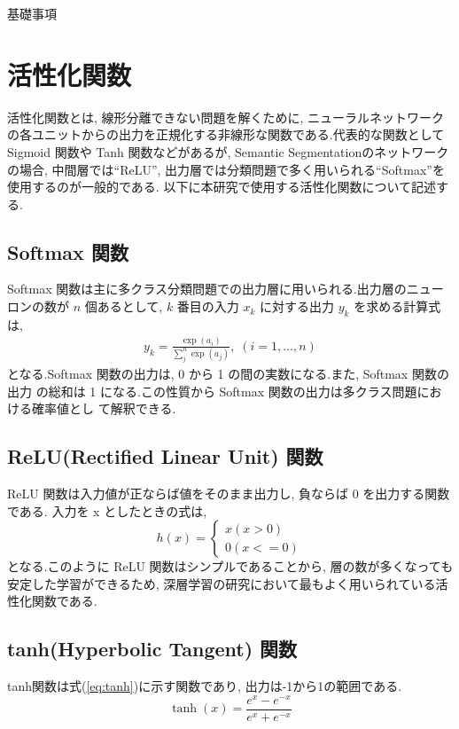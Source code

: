 \appendix
\begin{chapter}{基礎事項}
\section{活性化関数}\label{hu:ac_fn}
活性化関数とは, 線形分離できない問題を解くために, ニューラルネットワークの各ユニットからの出力を正規化する非線形な関数である.代表的な関数として Sigmoid 関数や Tanh 関数などがあるが, Semantic Segmentationのネットワークの場合, 中間層では``ReLU''\cite{relu}, 出力層では分類問題で多く用いられる``Softmax''\cite{softmax}を使用するのが一般的である. 以下に本研究で使用する活性化関数について記述する.  
\subsection*{Softmax 関数}
Softmax 関数\cite{softmax}は主に多クラス分類問題での出力層に用いられる.出力層のニューロンの数が $n$ 個あるとして, $k$ 番目の入力 $x_k$ に対する出力 $y_k$ を求める計算式は, 
\begin{equation}
    \begin{split}
        y_k = \frac{\exp(a_i)}{\sum_j^n \exp(a_j)},\;(i=1,\ldots,n)
    \end{split}
\end{equation}
となる.Softmax 関数の出力は, 0 から 1 の間の実数になる.また, Softmax 関数の出力 の総和は 1 になる.この性質から Softmax 関数の出力は多クラス問題における確率値とし て解釈できる.
\subsection*{ReLU(Rectified Linear Unit) 関数}
ReLU 関数\cite{relu}は入力値が正ならば値をそのまま出力し, 負ならば 0 を出力する関数である.
入力を x としたときの式は, 
\begin{equation}
h(x) = 
    \begin{cases}
        x  (x>0)\\
        0  (x<=0)
    \end{cases}
\end{equation}
となる.このように ReLU 関数はシンプルであることから, 層の数が多くなっても安定した学習ができるため, 深層学習の研究において最もよく用いられている活性化関数である.

\subsection*{tanh(Hyperbolic Tangent) 関数}
tanh関数は式(\ref{eq:tanh})に示す関数であり, 出力は-1から1の範囲である.
\begin{equation}
\tanh(x) = \frac{e^{x}-e^{-x}}{e^{x}+e^{-x}} \label{eq:tanh}
\end{equation}


\end{chapter}

